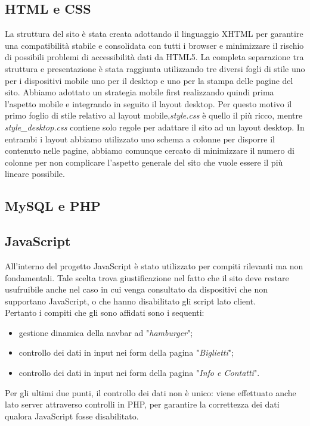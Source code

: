 \subsection{HTML e CSS}
La struttura del sito è stata creata adottando il linguaggio XHTML per garantire una compatibilità stabile e consolidata con tutti i browser e minimizzare il rischio di possibili problemi di accessibilità dati da HTML5.
La completa separazione tra struttura e presentazione è stata raggiunta utilizzando tre diversi fogli di stile uno per i dispositivi mobile uno per il desktop e uno per la stampa delle pagine del sito. Abbiamo adottato un strategia mobile first realizzando quindi prima l'aspetto mobile e integrando in seguito il layout desktop. Per questo motivo il primo foglio di stile relativo al layout mobile,\textit{style.css} è quello il più ricco, mentre \textit{style\_desktop.css} contiene solo regole per adattare il sito ad un layout desktop. In entrambi i layout abbiamo utilizzato uno schema a colonne per disporre il contenuto nelle pagine, abbiamo comunque cercato di minimizzare il numero di colonne per non complicare l'aspetto generale del sito che vuole essere il più lineare possibile.

\subsection{MySQL e PHP}

\subsection{JavaScript}
All'interno del progetto JavaScript è stato utilizzato per compiti rilevanti ma non fondamentali. Tale scelta trova giustificazione nel fatto che il sito deve restare usufruibile anche nel caso in cui venga consultato da dispositivi che non supportano JavaScript, o che hanno disabilitato gli script lato client.\\
Pertanto i compiti che gli sono affidati sono i sequenti:
\begin{itemize}
	\item gestione dinamica della navbar ad "\textit{hamburger}";
	\item controllo dei dati in input nei form della pagina "\textit{Biglietti}";
	\item controllo dei dati in input nei form della pagina "\textit{Info e Contatti}".
\end{itemize}
Per gli ultimi due punti, il controllo dei dati non è unico: viene effettuato anche lato server attraverso controlli in PHP, per garantire la correttezza dei dati qualora JavaScript fosse disabilitato.
